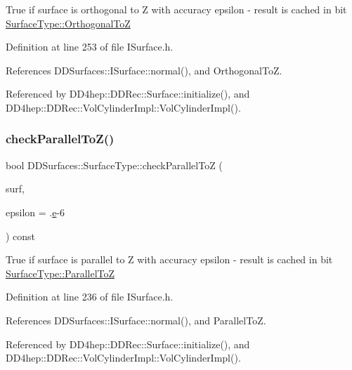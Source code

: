 True if surface is orthogonal to Z with accuracy epsilon -\/ result is cached in bit \hyperlink{class_d_d_surfaces_1_1_surface_type_a2e946294c5368a34e227be2b17e73051ac72842b667410b4ce6e55451902460ee}{Surface\+Type\+::\+Orthogonal\+ToZ} 

Definition at line 253 of file I\+Surface.\+h.



References D\+D\+Surfaces\+::\+I\+Surface\+::normal(), and Orthogonal\+ToZ.



Referenced by D\+D4hep\+::\+D\+D\+Rec\+::\+Surface\+::initialize(), and D\+D4hep\+::\+D\+D\+Rec\+::\+Vol\+Cylinder\+Impl\+::\+Vol\+Cylinder\+Impl().

\hypertarget{class_d_d_surfaces_1_1_surface_type_a0e8804669d1af234d9e268e3f13abd10}{}\label{class_d_d_surfaces_1_1_surface_type_a0e8804669d1af234d9e268e3f13abd10} 
\subsubsection{\texorpdfstring{check\+Parallel\+To\+Z()}{checkParallelToZ()}}
{\footnotesize\ttfamily bool D\+D\+Surfaces\+::\+Surface\+Type\+::check\+Parallel\+ToZ (\begin{DoxyParamCaption}\item[{const \hyperlink{class_d_d_surfaces_1_1_i_surface}{I\+Surface} \&}]{surf,  }\item[{double}]{epsilon = {.\hyperlink{_volumes_8cpp_a8a9a1f93e9b09afccaec215310e64142}{e}-\/6} }\end{DoxyParamCaption}) const\hspace{0.3cm}{\ttfamily [inline]}}

True if surface is parallel to Z with accuracy epsilon -\/ result is cached in bit \hyperlink{class_d_d_surfaces_1_1_surface_type_a2e946294c5368a34e227be2b17e73051aedf49a5300dce095439f45b9390faa5f}{Surface\+Type\+::\+Parallel\+ToZ} 

Definition at line 236 of file I\+Surface.\+h.



References D\+D\+Surfaces\+::\+I\+Surface\+::normal(), and Parallel\+ToZ.



Referenced by D\+D4hep\+::\+D\+D\+Rec\+::\+Surface\+::initialize(), and D\+D4hep\+::\+D\+D\+Rec\+::\+Vol\+Cylinder\+Impl\+::\+Vol\+Cylinder\+Impl().

